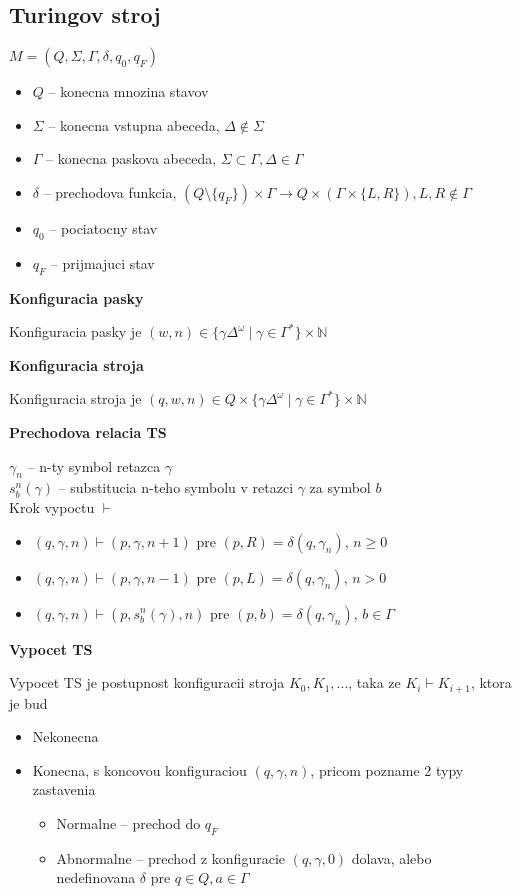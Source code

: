 \documentclass[12pt]{article}
\newcommand{\pipesep}{\hspace{3pt} \vert \hspace{3pt}}
\begin{document}
\subsection*{Turingov stroj}
$M = (Q,\Sigma,\Gamma,\delta,q_{0},q_{F})$
\begin{itemize}
	\item $Q$ -- konecna mnozina stavov
	\item $\Sigma$ -- konecna vstupna abeceda, $\Delta \not\in \Sigma$
	\item $\Gamma$ -- konecna paskova abeceda, $\Sigma \subset \Gamma, \Delta \in \Gamma$
	\item $\delta$ -- prechodova funkcia, $(Q \setminus \{q_{F}\}) \times \Gamma \to Q \times (\Gamma \times \{L,R\}), L,R \not\in \Gamma$
	\item $q_{0}$ -- pociatocny stav
	\item $q_{F}$ -- prijmajuci stav
\end{itemize}

\textbf{Konfiguracia pasky}

Konfiguracia pasky je $(w,n) \in \{\gamma\Delta^{\omega} \pipesep \gamma \in \Gamma^{*}\} \times \mathbb{N}$

\textbf{Konfiguracia stroja}

Konfiguracia stroja je $(q,w,n) \in Q \times \{\gamma\Delta^{\omega} \pipesep \gamma \in \Gamma^{*}\} \times \mathbb{N}$

\textbf{Prechodova relacia TS}

$\gamma_{n}$ -- n-ty symbol retazca $\gamma$\\
$s^{n}_{b}(\gamma)$ -- substitucia n-teho symbolu v retazci $\gamma$ za symbol $b$ \\
Krok vypoctu $\vdash$
\begin{itemize}
	\item $(q,\gamma,n) \vdash (p,\gamma,n+1)$ pre $(p,R) = \delta(q,\gamma_{n})$, $n \ge 0$
	\item $(q,\gamma,n) \vdash (p,\gamma,n-1)$ pre $(p,L) = \delta(q,\gamma_{n})$, $n > 0$
	\item $(q,\gamma,n) \vdash (p,s^{n}_{b}(\gamma),n)$ pre $(p,b) = \delta(q,\gamma_{n})$, $b \in \Gamma$
\end{itemize}

\textbf{Vypocet TS}

Vypocet TS je postupnost konfiguracii stroja $K_{0}, K_{1}, ...$, taka ze $K_{i} \vdash K_{i+1}$, ktora je bud
\begin{itemize}
	\item Nekonecna
	\item Konecna, s koncovou konfiguraciou $(q,\gamma,n)$, pricom pozname 2 typy zastavenia
		\begin{itemize}
			\item Normalne -- prechod do $q_{F}$
			\item Abnormalne -- prechod z konfiguracie $(q,\gamma,0)$ dolava, alebo nedefinovana $\delta$ pre $q \in Q, a \in \Gamma$
		\end{itemize}
\end{itemize}
\end{document}
